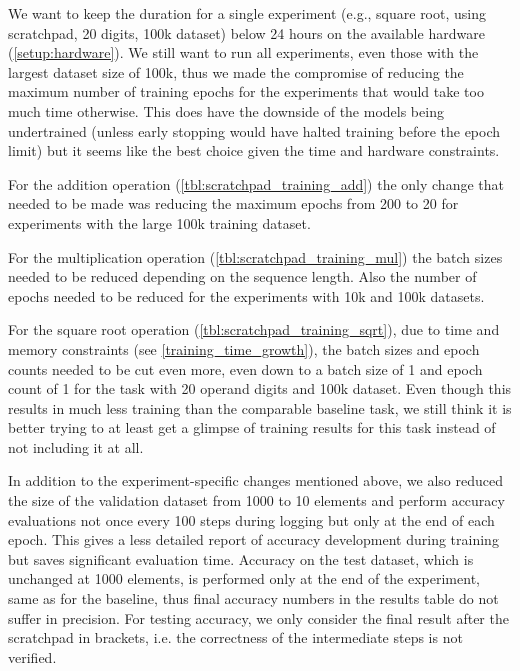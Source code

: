 We want to keep the duration for a single experiment (e.g., square root, using scratchpad, 20 digits, 100k dataset) below 24 hours on the available hardware (\cref{setup:hardware}).
We still want to run all experiments, even those with the largest dataset size of 100k, thus we made the compromise of reducing the maximum number of training epochs for the experiments that would take too much time otherwise. This does have the downside of the models being undertrained (unless early stopping would have halted training before the epoch limit) but it seems like the best choice given the time and hardware constraints.


For the addition operation (\cref{tbl:scratchpad_training_add}) the only change that needed to be made was reducing the maximum epochs from 200 to 20 for experiments with the large 100k training dataset.

For the multiplication operation (\cref{tbl:scratchpad_training_mul}) the batch sizes needed to be reduced depending on the sequence length. Also the number of epochs needed to be reduced for the experiments with 10k and 100k datasets.

For the square root operation (\cref{tbl:scratchpad_training_sqrt}), due to time and memory constraints (see \cref{training_time_growth}), the batch sizes and epoch counts needed to be cut even more, even down to a batch size of 1 and epoch count of 1 for the task with 20 operand digits and 100k dataset. Even though this results in much less training than the comparable baseline task, we still think it is better trying to at least get a glimpse of training results for this task instead of not including it at all.

In addition to the experiment-specific changes mentioned above, we also reduced the size of the validation dataset from 1000 to 10 elements and perform accuracy evaluations not once every 100 steps during logging but only at the end of each epoch. This gives a less detailed report of accuracy development during training but saves significant evaluation time. Accuracy on the test dataset, which is unchanged at 1000 elements, is performed only at the end of the experiment, same as for the baseline, thus final accuracy numbers in the results table do not suffer in precision.
For testing accuracy, we only consider the final result after the scratchpad in brackets, i.e. the correctness of the intermediate steps is not verified.

